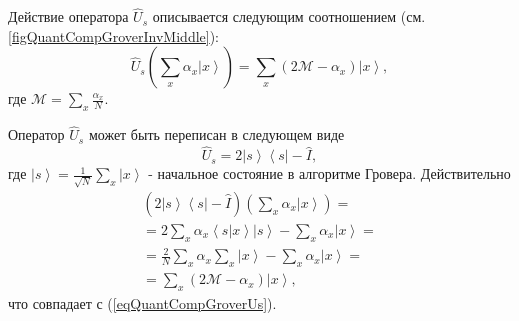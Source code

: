 

Действие оператора $\hat{U}_s$ описывается следующим соотношением
(см. \autoref{figQuantCompGroverInvMiddle}):
\begin{equation}
\hat{U}_s\left(\sum_x \alpha_x \left|x\right>\right) = 
\sum_x \left(2 \mathcal{M} - \alpha_x \right)\left|x\right>,
\label{eqQuantCompGroverUs}
\end{equation} 
где $\mathcal{M} = \sum_x \frac{\alpha_x}{N}$.

Оператор $\hat{U}_s$ может быть переписан в следующем виде
\begin{equation}
\hat{U}_s = 
2 \left|s\right>\left<s\right| - \hat{I},
\nonumber
\end{equation}
где $\left|s\right>=\frac{1}{\sqrt{N}}\sum_x \left|x\right>$ -
начальное состояние в алгоритме Гровера.
Действительно
\begin{eqnarray}
\left(2 \left|s\right>\left<s\right| - \hat{I}\right)
\left(\sum_x \alpha_x \left|x\right>\right) =
\nonumber \\
=  2 \sum_x \alpha_x \left<s\right.\left|x\right> \left|s\right> 
- \sum_x \alpha_x \left|x\right> = 
\nonumber \\
=
\frac{2}{N} \sum_x \alpha_x \sum_x \left|x\right> -
\sum_x \alpha_x \left|x\right> = 
\nonumber \\
= \sum_x \left( 2 \mathcal{M} -\alpha_x \right) \left|x\right>,
\nonumber
\end{eqnarray}
что совпадает с (\ref{eqQuantCompGroverUs}).




